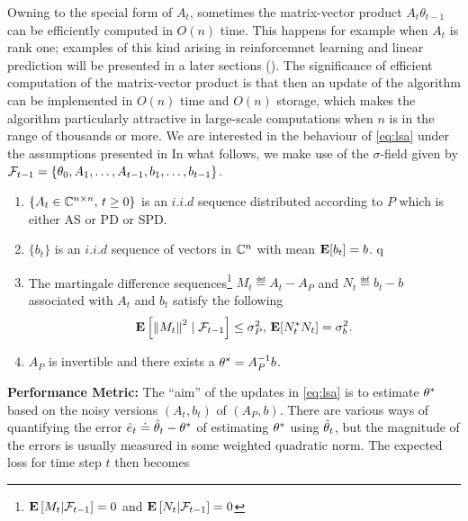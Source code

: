 Owning to the special form of $A_t$, sometimes the matrix-vector product $A_t \theta_{t-1}$
can be efficiently computed in $O(n)$ time.
This happens for example when $A_t$ is rank one; examples of this kind arising in reinforcemnet learning \cite{} and linear prediction \cite{} will be presented in a later sections (). The significance of efficient computation of the matrix-vector product is that then an update of the algorithm
can be implemented in $O(n)$ time and $O(n)$ storage, which makes the algorithm particularly attractive in large-scale computations when $n$ is in the range of thousands or more.
We are interested in the behaviour of \eqref{eq:lsa} under the assumptions presented in  In what follows, we make use of the $\sigma$-field given by $\mathcal{F}_{t-1}=\{\theta_0,A_1,\ldots, A_{t-1}, b_1,\ldots, b_{t-1}\}$.
\begin{assumption}\label{assmp:lsa}
\begin{enumerate}[leftmargin=*, before = \leavevmode\vspace{-\baselineskip}]
\item \label{dist} $\{A_t\in\mathbb{C}^{n\times n},\, t\geq 0\}$ is an $i.i.d$ sequence distributed according to $P$ which is either AS or PD or SPD.
\item $\{b_t\}$ is an $i.i.d$ sequence of vectors in $\mathbb{C}^n$ with mean $\mathbf{E}[b_t]=b$.
q\item \label{matvar} The martingale difference sequences\footnote{$\mathbf{E}\left[M_t|\mathcal{F}_{t-1}\right]=0$ and $\mathbf{E}\left[N_t|\mathcal{F}_{t-1}\right]=0$} $M_t\eqdef A_t-A_P$ and $N_t\eqdef b_t-b$ associated with $A_t$ and $b_t$ satisfy the following
\begin{align*}\mathbf{E}\left[ \left\| M_t\right\|^2\mid\mathcal{F}_{t-1}\right]\leq \sigma^2_P, \, \mathbf{E}[N_t^* N_t]=\sigma_b^2.\end{align*}
\item $A_P$ is invertible and there exists a $\theta^*=A_P^{-1}b$.
\end{enumerate}
\end{assumption}
\textbf{Performance Metric:}
The ``aim'' of the updates in \eqref{eq:lsa} is to estimate $\theta^*$ based on the noisy versions $(A_t,b_t)$ of $(A_P,b)$.
There are various ways of quantifying the error $\hat{e}_t \doteq \hat{\theta}_t- \theta^*$ of estimating $\theta^*$ using $\hat{\theta}_t$, but the magnitude
of the errors is usually measured in some weighted quadratic norm. The expected loss for time step $t$ then becomes
